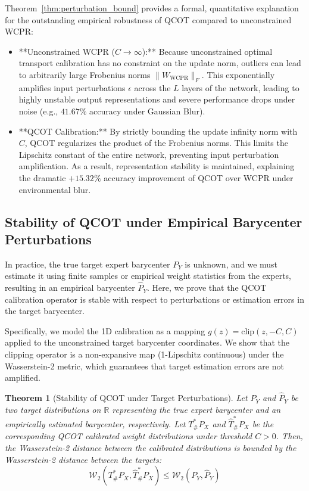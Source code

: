 \documentclass{article}
\theoremstyle{plain}
\newtheorem{theorem}{Theorem}[section]
\theoremstyle{definition}
\theoremstyle{remark}
\begin{document}
Theorem~\ref{thm:perturbation_bound} provides a formal, quantitative explanation for the outstanding empirical robustness of QCOT compared to unconstrained WCPR:
\begin{itemize}
    \item **Unconstrained WCPR ($C \to \infty$):** Because unconstrained optimal transport calibration has no constraint on the update norm, outliers can lead to arbitrarily large Frobenius norms $\|W_{\text{WCPR}}\|_F$. This exponentially amplifies input perturbations $\epsilon$ across the $L$ layers of the network, leading to highly unstable output representations and severe performance drops under noise (e.g., $41.67\%$ accuracy under Gaussian Blur).
    \item **QCOT Calibration:** By strictly bounding the update infinity norm with $C$, QCOT regularizes the product of the Frobenius norms. This limits the Lipschitz constant of the entire network, preventing input perturbation amplification. As a result, representation stability is maintained, explaining the dramatic $+15.32\%$ accuracy improvement of QCOT over WCPR under environmental blur.
\end{itemize}

\subsection{Stability of QCOT under Empirical Barycenter Perturbations}
\label{sec:proof_stability}

In practice, the true target expert barycenter $P_Y$ is unknown, and we must estimate it using finite samples or empirical weight statistics from the experts, resulting in an empirical barycenter $\widehat{P}_Y$. Here, we prove that the QCOT calibration operator is stable with respect to perturbations or estimation errors in the target barycenter.

Specifically, we model the 1D calibration as a mapping $g(z) = \text{clip}(z, -C, C)$ applied to the unconstrained target barycenter coordinates. We show that the clipping operator is a non-expansive map (1-Lipschitz continuous) under the Wasserstein-2 metric, which guarantees that target estimation errors are not amplified.

\begin{theorem}[Stability of QCOT under Target Perturbations]
Let $P_Y$ and $\widehat{P}_Y$ be two target distributions on $\mathbb{R}$ representing the true expert barycenter and an empirically estimated barycenter, respectively. Let $T^*_{\#} P_X$ and $\widehat{T}^*_{\#} P_X$ be the corresponding QCOT calibrated weight distributions under threshold $C > 0$. Then, the Wasserstein-2 distance between the calibrated distributions is bounded by the Wasserstein-2 distance between the targets:
\begin{equation}
    \mathcal{W}_2\left( T^*_{\#} P_X, \widehat{T}^*_{\#} P_X \right) \le \mathcal{W}_2\left( P_Y, \widehat{P}_Y \right)
\end{equation}
\label{thm:stability}
\end{theorem}
\end{document}
